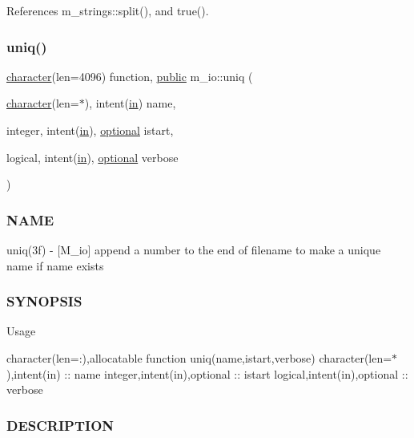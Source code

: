 References m\+\_\+strings\+::split(), and true().

\mbox{\label{namespacem__io_a13a76a3cca012978c1d9c5c0c8b4a7ef}} 
\subsubsection{\texorpdfstring{uniq()}{uniq()}}
{\footnotesize\ttfamily \hyperlink{option__stopwatch_83_8txt_abd4b21fbbd175834027b5224bfe97e66}{character}(len=4096) function, \hyperlink{M__stopwatch_83_8txt_a2f74811300c361e53b430611a7d1769f}{public} m\+\_\+io\+::uniq (\begin{DoxyParamCaption}\item[{\hyperlink{option__stopwatch_83_8txt_abd4b21fbbd175834027b5224bfe97e66}{character}(len=$\ast$), intent(\hyperlink{M__journal_83_8txt_afce72651d1eed785a2132bee863b2f38}{in})}]{name,  }\item[{integer, intent(\hyperlink{M__journal_83_8txt_afce72651d1eed785a2132bee863b2f38}{in}), \hyperlink{option__stopwatch_83_8txt_aa4ece75e7acf58a4843f70fe18c3ade5}{optional}}]{istart,  }\item[{logical, intent(\hyperlink{M__journal_83_8txt_afce72651d1eed785a2132bee863b2f38}{in}), \hyperlink{option__stopwatch_83_8txt_aa4ece75e7acf58a4843f70fe18c3ade5}{optional}}]{verbose }\end{DoxyParamCaption})}



\subsubsection*{N\+A\+ME}

uniq(3f) -\/ \mbox{[}M\+\_\+io\mbox{]} append a number to the end of filename to make a unique name if name exists \subsubsection*{S\+Y\+N\+O\+P\+S\+IS}

Usage

character(len=\+:),allocatable function uniq(name,istart,verbose) character(len=$\ast$),intent(in) \+:\+: name integer,intent(in),optional \+:\+: istart logical,intent(in),optional \+:\+: verbose

\subsubsection*{D\+E\+S\+C\+R\+I\+P\+T\+I\+ON}

